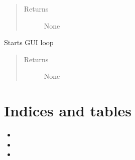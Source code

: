 \documentclass[letterpaper,10pt,english]{sphinxmanual}
\begin{document}
\begin{fulllineitems}
\begin{fulllineitems}
\begin{quote}
\begin{description}
\item[{Returns}] \leavevmode
\sphinxAtStartPar
None

\end{description}\end{quote}

\end{fulllineitems}


\begin{fulllineitems}
\label{\detokenize{index:HDF5Browser.FileBrowser.start}}
\sphinxAtStartPar
Starts GUI loop
\begin{quote}\begin{description}
\item[{Returns}] \leavevmode
\sphinxAtStartPar
None

\end{description}\end{quote}

\end{fulllineitems}


\end{fulllineitems}



\chapter{Indices and tables}
\label{\detokenize{index:indices-and-tables}}\begin{itemize}
\item {} 
\sphinxAtStartPar
{}

\item {} 
\sphinxAtStartPar
{}

\item {} 
\sphinxAtStartPar
{}

\end{itemize}


\renewcommand{\indexname}{Python Module Index}
\begin{sphinxtheindex}
\let\bigletter\sphinxstyleindexlettergroup
\bigletter{d}
\item\relax{}
\indexspace
\bigletter{h}
\item\relax{}
\item\relax{}
\indexspace
\bigletter{i}
\item\relax{}
\end{sphinxtheindex}

\renewcommand{\indexname}{Index}
\printindex
\end{document}
